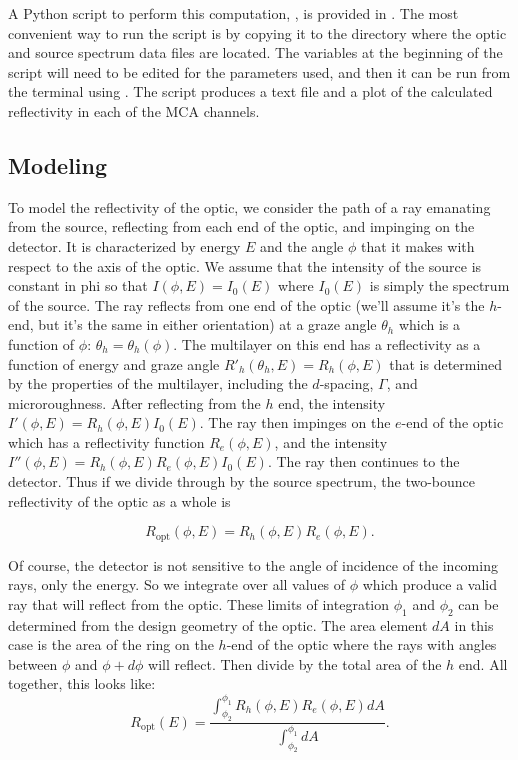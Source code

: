 A Python script to perform this computation, , is provided
in . The most convenient way to run the script is by
copying it to the directory where the optic and source spectrum data files are
located. The variables at the beginning of the script will need to be edited for
the parameters used, and then it can be run from the terminal using
. The script produces a text file and a plot of the
calculated reflectivity in each of the MCA channels.

\subsection{Modeling}

To model the reflectivity of the optic, we consider the path of a ray emanating
from the source, reflecting from each end of the optic, and impinging on the
detector. It is characterized by energy $E$ and the angle $\phi$ that it makes
with respect to the axis of the optic. We assume that the intensity of the
source is constant in phi so that $I(\phi, E) = I_0(E)$ where $I_0(E)$ is simply
the spectrum of the source. The ray reflects from one end of the optic (we'll
assume it's the $h$-end, but it's the same in either orientation) at a graze
angle $\theta_h$ which is a function of $\phi$: $\theta_h = \theta_h(\phi)$. The
multilayer on this end has a reflectivity as a function of energy and graze
angle $R'_h(\theta_h, E) = R_h(\phi, E)$ that is determined by the properties of
the multilayer, including the $d$-spacing, $\Gamma$, and microroughness. After
reflecting from the $h$ end, the intensity $I'(\phi, E) = R_h(\phi, E)
I_0(E)$. The ray then impinges on the $e$-end of the optic which has a
reflectivity function $R_e(\phi, E)$, and the intensity
$I''(\phi, E) = R_h(\phi, E) R_e(\phi, E) I_0(E)$. The ray then continues to the
detector. Thus if we divide through by the source spectrum, the two-bounce
reflectivity of the optic as a whole is

\begin{equation}
  R_\text{opt}(\phi, E) = R_h(\phi, E) R_e(\phi, E) .
  \label{eq:dbl_bounce}
\end{equation}

Of course, the detector is not sensitive to the angle of incidence of the
incoming rays, only the energy. So we integrate over all values of $\phi$ which
produce a valid ray that will reflect from the optic. These limits of
integration $\phi_1$ and $\phi_2$ can be determined from the design geometry of
the optic. The area element $dA$ in this case is the area of the ring on the $h$-end
of the optic where the rays with angles between $\phi$ and $\phi + d\phi$ will
reflect. Then divide by the total area of the $h$ end. All together, this looks
like:
\begin{equation}
  \label{eq:area_int}
  R_\text{opt}(E) = \frac{\int^{\phi_1}_{\phi_2} R_h(\phi, E) R_e(\phi, E) dA}{
    \int^{\phi_1}_{\phi_2} dA } .
\end{equation}

